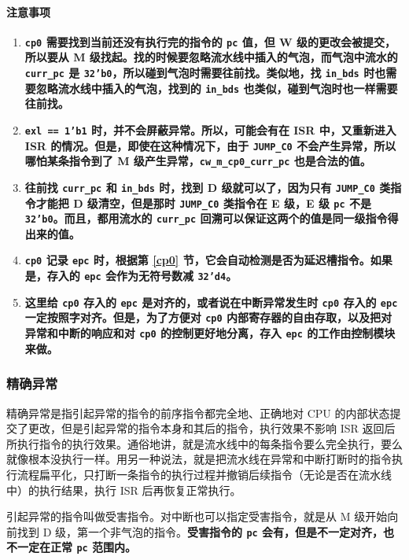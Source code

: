 \documentclass[12pt,AutoFakeBold,AutoFakeSlant]{article}
\providecommand{\tightlist}{%
  \setlength{\itemsep}{0pt}\setlength{\parskip}{0pt}}
\newcommand{\ms}[1]{\texttt{#1}}
\begin{document}
\paragraph{注意事项}

\begin{enumerate}
\tightlist
\item
\textbf{\ms{cp0} 需要找到当前还没有执行完的指令的 \ms{pc} 值，但 W 级的更改会被提交，所以要从 M 级找起。找的时候要忽略流水线中插入的气泡，而气泡中流水的 \ms{curr\_pc} 是 \ms{32'b0}，所以碰到气泡时需要往前找。类似地，找 \ms{in\_bds} 时也需要忽略流水线中插入的气泡，找到的 \ms{in\_bds} 也类似，碰到气泡时也一样需要往前找。}
\item
\textbf{\ms{exl == 1'b1} 时，并不会屏蔽异常。所以，可能会有在 ISR 中，又重新进入 ISR 的情况。但是，即使在这种情况下，由于 \ms{JUMP\_C0} 不会产生异常，所以哪怕某条指令到了 M 级产生异常，\ms{cw\_m\_cp0\_curr\_pc} 也是合法的值。}
\item
\textbf{往前找 \ms{curr\_pc} 和 \ms{in\_bds} 时，找到 D 级就可以了，因为只有 \ms{JUMP\_C0} 类指令才能把 D 级清空，但是那时 \ms{JUMP\_C0} 类指令在 E 级，E 级 \ms{pc} 不是 \ms{32'b0}。而且，都用流水的 \ms{curr\_pc} 回溯可以保证这两个的值是同一级指令得出来的值。}
\item
\textbf{\ms{cp0} 记录 \ms{epc} 时，根据第 \ref{cp0} 节，它会自动检测是否为延迟槽指令。如果是，存入的 \ms{epc} 会作为无符号数减 \ms{32'd4}。}
\item
\textbf{这里给 \ms{cp0} 存入的 \ms{epc} 是对齐的，或者说在中断异常发生时 \ms{cp0} 存入的 \ms{epc} 一定按照字对齐。但是，为了方便对 \ms{cp0} 内部寄存器的自由存取，以及把对异常和中断的响应和对 \ms{cp0} 的控制更好地分离，存入 \ms{epc} 的工作由控制模块来做。}
\end{enumerate}

\subsubsection{精确异常}

精确异常是指引起异常的指令的前序指令都完全地、正确地对 CPU 的内部状态提交了更改，但是引起异常的指令本身和其后的指令，执行效果不影响 ISR 返回后所执行指令的执行效果。通俗地讲，就是流水线中的每条指令要么完全执行，要么就像根本没执行一样。用另一种说法，就是把流水线在异常和中断打断时的指令执行流程扁平化，只打断一条指令的执行过程并撤销后续指令（无论是否在流水线中）的执行结果，执行 ISR 后再恢复正常执行。

引起异常的指令叫做受害指令。对中断也可以指定受害指令，就是从 M 级开始向前找到 D 级，第一个非气泡的指令。\textbf{受害指令的 \ms{pc} 会有，但是不一定对齐，也不一定在正常 \ms{pc} 范围内。}
\end{document}
